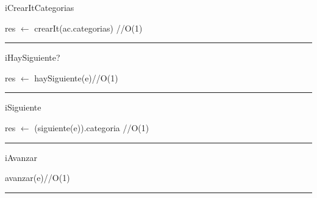 \begin{algorithm}[H]
\caption{iCrearItCategorias}
\begin{algorithmic}[1]
\State res $\gets$ crearIt(ac.categorias) \hfill //O(1)
\EndFunction 
\end{algorithmic}
\hrule
{}
\end{algorithm}

\begin{algorithm}[H]
\caption{iHaySiguiente?}
\begin{algorithmic}[1]
\state res $\gets$ haySiguiente(e)\hfill //O(1)
\EndFunction 
\end{algorithmic}
\hrule
{}
\end{algorithm}

\begin{algorithm}[H]
\caption{iSiguiente}
\begin{algorithmic}[1]
\state res $\gets$ (siguiente(e)).categoria \hfill //O(1)
\EndFunction 
\end{algorithmic}
\hrule
{}
\end{algorithm}

\begin{algorithm}[H]
\caption{iAvanzar}
\begin{algorithmic}[1]
\state avanzar(e)\hfill //O(1)
\EndFunction 
\end{algorithmic}
\hrule
{}
\end{algorithm}